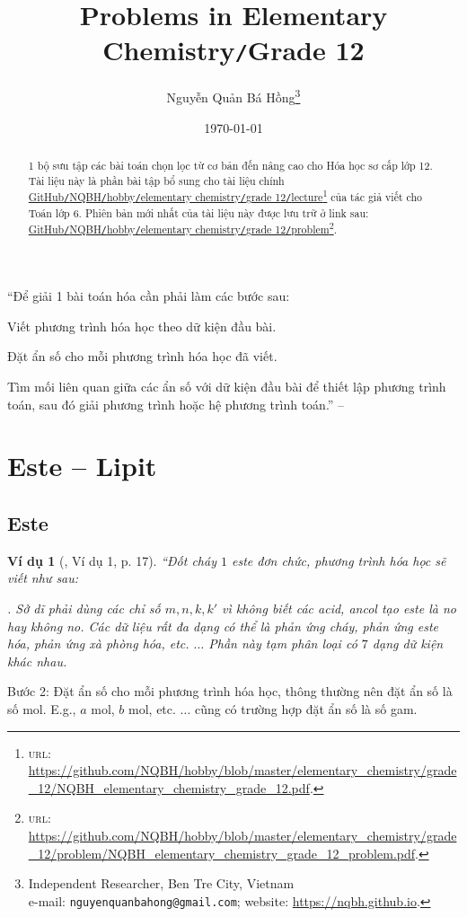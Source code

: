 \documentclass{article}
\title{Problems in Elementary Chemistry\texttt{/}Grade 12}
\author{Nguyễn Quản Bá Hồng\footnote{Independent Researcher, Ben Tre City, Vietnam\\e-mail: \texttt{nguyenquanbahong@gmail.com}; website: \url{https://nqbh.github.io}.}}
\date{\today}
\numberwithin{equation}{section}
\newtheorem{vidu}{Ví dụ}[section]
\begin{document}
\maketitle
\begin{abstract}
	1 bộ sưu tập các bài toán chọn lọc từ cơ bản đến nâng cao cho Hóa học sơ cấp lớp 12. Tài liệu này là phần bài tập bổ sung cho tài liệu chính \href{https://github.com/NQBH/hobby/blob/master/elementary_chemistry/grade_12/NQBH_elementary_chemistry_grade_12.pdf}{GitHub\texttt{/}NQBH\texttt{/}hobby\texttt{/}elementary chemistry\texttt{/}grade 12\texttt{/}lecture}\footnote{\textsc{url}: \url{https://github.com/NQBH/hobby/blob/master/elementary_chemistry/grade_12/NQBH_elementary_chemistry_grade_12.pdf}.} của tác giả viết cho Toán lớp 6. Phiên bản mới nhất của tài liệu này được lưu trữ ở link sau: \href{https://github.com/NQBH/hobby/blob/master/elementary_chemistry/grade_12/problem/NQBH_elementary_chemistry_grade_12_problem.pdf}{GitHub\texttt{/}NQBH\texttt{/}hobby\texttt{/}elementary chemistry\texttt{/}grade 12\texttt{/}problem}\footnote{\textsc{url}: \url{https://github.com/NQBH/hobby/blob/master/elementary_chemistry/grade_12/problem/NQBH_elementary_chemistry_grade_12_problem.pdf}.}.
\end{abstract}
\tableofcontents
\newpage


``Để giải 1 bài toán hóa cần phải làm các bước sau:
\begin{enumerate*}
	\item[\textbf{1.}] Viết phương trình hóa học theo dữ kiện đầu bài.
	\item[\textbf{2.}] Đặt ẩn số cho mỗi phương trình hóa học đã viết.
	\item[\textbf{3.}] Tìm mối liên quan giữa các ẩn số với dữ kiện đầu bài để thiết lập phương trình toán, sau đó giải phương trình hoặc hệ phương trình toán.'' -- \cite[p. 17]{An2008}
\end{enumerate*}

\section{Este -- Lipit}

\subsection{Este}

\begin{vidu}[\cite{An2008}, Ví dụ 1, p. 17]
	``Đốt cháy $1$ este đơn chức, phương trình hóa học sẽ viết như sau:
	
	\emph{}. Sở dĩ phải dùng các chỉ số $m,n,k,k'$ vì không biết các acid, ancol tạo este là no hay không no. Các dữ liệu rất đa dạng có thể là phản ứng cháy, phản ứng este hóa, phản ứng xà phòng hóa, etc. $\ldots$ Phần này tạm phân loại có $7$ dạng dữ kiện khác nhau.
\end{vidu}
Bước 2: Đặt ẩn số cho mỗi phương trình hóa học, thông thường nên đặt ẩn số là số mol. E.g., $a$ mol, $b$ mol, etc. $\ldots$ cũng có trường hợp đặt ẩn số là số gam.
\end{document}
